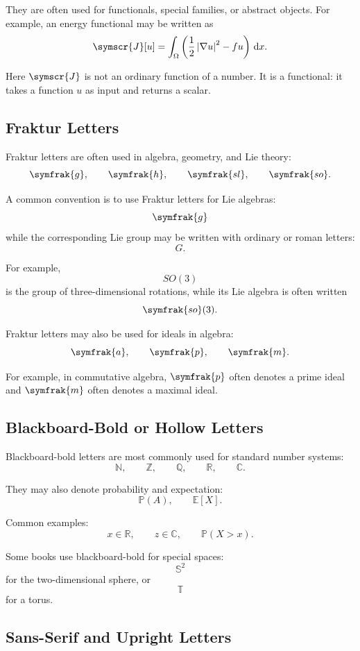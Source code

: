 \documentclass[11pt,twocolumn]{article}
\newcommand{\abs}[1]{\left\lvert #1 \right\rvert}
\newcommand{\dd}{\,\mathrm{d}}
\newcommand{\grad}{\nabla}
\begin{document}
They are often used for functionals, special families, or abstract objects.
For example, an energy functional may be written as
\[
\symscr{J}[u]
=
\int_{\Omega}
\left(
\frac{1}{2}\abs{\grad u}^{2}
-
fu
\right)\dd x.
\]

Here \(\symscr{J}\) is not an ordinary function of a number. It is a functional:
it takes a function \(u\) as input and returns a scalar.

\subsection{Fraktur Letters}

Fraktur letters are often used in algebra, geometry, and Lie theory:
\[
\symfrak{g},
\qquad
\symfrak{h},
\qquad
\symfrak{sl},
\qquad
\symfrak{so}.
\]

A common convention is to use Fraktur letters for Lie algebras:
\[
\symfrak{g}
\]
while the corresponding Lie group may be written with ordinary or roman letters:
\[
G.
\]

For example,
\[
SO(3)
\]
is the group of three-dimensional rotations, while its Lie algebra is often
written
\[
\symfrak{so}(3).
\]

Fraktur letters may also be used for ideals in algebra:
\[
\symfrak{a},
\qquad
\symfrak{p},
\qquad
\symfrak{m}.
\]

For example, in commutative algebra, \(\symfrak{p}\) often denotes a prime
ideal and \(\symfrak{m}\) often denotes a maximal ideal.

\subsection{Blackboard-Bold or Hollow Letters}

Blackboard-bold letters are most commonly used for standard number systems:
\[
\mathbb{N},
\qquad
\mathbb{Z},
\qquad
\mathbb{Q},
\qquad
\mathbb{R},
\qquad
\mathbb{C}.
\]

They may also denote probability and expectation:
\[
\mathbb{P}(A),
\qquad
\mathbb{E}[X].
\]

Common examples:
\[
x \in \mathbb{R},
\qquad
z \in \mathbb{C},
\qquad
\mathbb{P}(X>x).
\]

Some books use blackboard-bold for special spaces:
\[
\mathbb{S}^{2}
\]
for the two-dimensional sphere, or
\[
\mathbb{T}
\]
for a torus.

\subsection{Sans-Serif and Upright Letters}
\end{document}
